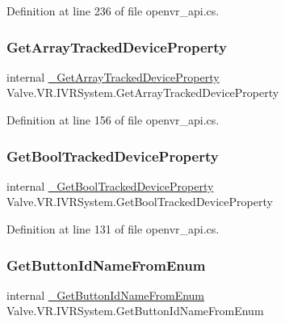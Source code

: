 Definition at line 236 of file openvr\+\_\+api.\+cs.

\mbox{\label{struct_valve_1_1_v_r_1_1_i_v_r_system_a8794f5d4fdd98afbaf5f0b60f78b841a}} 
\subsubsection{\texorpdfstring{GetArrayTrackedDeviceProperty}{GetArrayTrackedDeviceProperty}}
{\footnotesize\ttfamily internal \mbox{\hyperlink{struct_valve_1_1_v_r_1_1_i_v_r_system_a664650bb051f15b2aa5974a22fb4f483}{\+\_\+\+Get\+Array\+Tracked\+Device\+Property}} Valve.\+V\+R.\+I\+V\+R\+System.\+Get\+Array\+Tracked\+Device\+Property}



Definition at line 156 of file openvr\+\_\+api.\+cs.

\mbox{\label{struct_valve_1_1_v_r_1_1_i_v_r_system_aed27d542bd09a4f62c497e215cc9cbf8}} 
\subsubsection{\texorpdfstring{GetBoolTrackedDeviceProperty}{GetBoolTrackedDeviceProperty}}
{\footnotesize\ttfamily internal \mbox{\hyperlink{struct_valve_1_1_v_r_1_1_i_v_r_system_ad59f0298d859db814984c5b2c46e2a1c}{\+\_\+\+Get\+Bool\+Tracked\+Device\+Property}} Valve.\+V\+R.\+I\+V\+R\+System.\+Get\+Bool\+Tracked\+Device\+Property}



Definition at line 131 of file openvr\+\_\+api.\+cs.

\mbox{\label{struct_valve_1_1_v_r_1_1_i_v_r_system_a33d4426980f8543ddb97498cd31d712d}} 
\subsubsection{\texorpdfstring{GetButtonIdNameFromEnum}{GetButtonIdNameFromEnum}}
{\footnotesize\ttfamily internal \mbox{\hyperlink{struct_valve_1_1_v_r_1_1_i_v_r_system_a0a9463bae6cfe3289f8b18e79db1dbb4}{\+\_\+\+Get\+Button\+Id\+Name\+From\+Enum}} Valve.\+V\+R.\+I\+V\+R\+System.\+Get\+Button\+Id\+Name\+From\+Enum}



